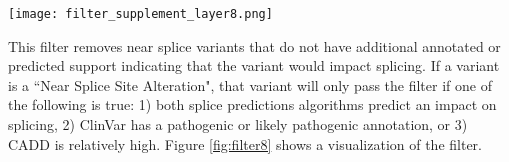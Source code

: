 \documentclass{article}
\begin{document}
\begin{sidewaysfigure}
\centering
\texttt{[image: filter\_supplement\_layer8.png]}
\caption{Near Splice filter.  This filter removes ``Near Splice Site Alteration" variants that are not supported to be deleterious by splice prediction algorithms, ClinVar annotations, or CADD predictions.}
\label{fig:filter8}
\end{sidewaysfigure}

This filter removes near splice variants that do not have additional annotated or predicted support indicating that the variant would impact splicing.  If a variant is a ``Near Splice Site Alteration", that variant will only pass the filter if one of the following is true: 1) both splice predictions algorithms predict an impact on splicing, 2) ClinVar has a pathogenic or likely pathogenic annotation, or 3) CADD is relatively high.  Figure \ref{fig:filter8} shows a visualization of the filter. 
\end{document}
